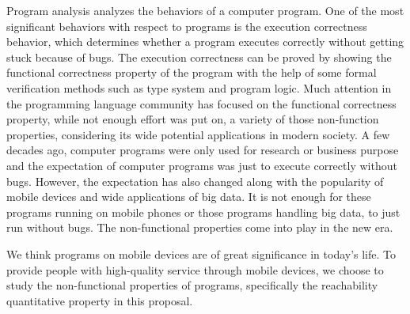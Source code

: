 Program analysis analyzes the behaviors of a computer program.
One of the most significant behaviors with respect to programs is the execution correctness behavior, which determines whether a program executes correctly without getting stuck because of bugs.
 The execution correctness can be proved by showing the functional correctness property of the program with the help of some formal verification methods such as type system and program logic.
 Much attention in the programming language community has focused on the functional correctness property, while not enough effort was put on, a variety of those non-function properties, considering its wide potential applications in modern society. 
 A few decades ago, computer programs were only used for research or business purpose and the expectation of computer programs was just to execute correctly without bugs. 
 However, the expectation has also changed along with the popularity of mobile devices and wide applications of big data. 
 It is not enough for these programs running on mobile phones or those programs handling big data, 
 to just run without bugs. 
 The non-functional properties
 come into play in the new era.

 We think programs on mobile devices are of great significance in today's life.
 To provide people with high-quality
 service through mobile devices,
we choose to study the non-functional properties of programs,
specifically the reachability quantitative property in this proposal.


